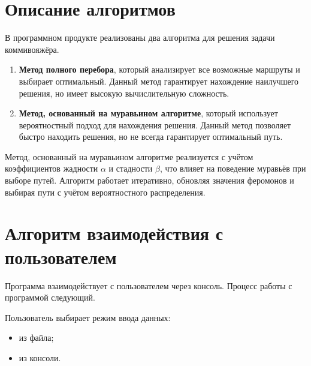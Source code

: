 \section{Описание алгоритмов}

В программном продукте реализованы два алгоритма для решения задачи коммивояжёра.

\begin{enumerate}
  \item[---] \textbf{Метод полного перебора}, который анализирует все возможные маршруты и выбирает оптимальный. Данный метод гарантирует нахождение наилучшего решения, но имеет высокую вычислительную сложность.
  \item[---] \textbf{Метод, основанный на муравьином алгоритме}, который использует вероятностный подход для нахождения решения. Данный метод позволяет быстро находить решения, но не всегда гарантирует оптимальный путь.
\end{enumerate}

Метод, основанный на муравьином алгоритме реализуется с учётом коэффициентов жадности $\alpha$ и стадности $\beta$, что влияет на поведение муравьёв при выборе путей. Алгоритм работает итеративно, обновляя значения феромонов и выбирая пути с учётом вероятностного распределения.

\section{Алгоритм взаимодействия с пользователем}

Программа взаимодействует с пользователем через консоль. Процесс работы с программой следующий.

Пользователь выбирает режим ввода данных:
\begin{itemize}
  \item из файла;
  \item из консоли.
\end{itemize}

